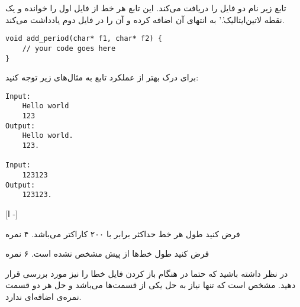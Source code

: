 \documentclass[../main.tex]{subfiles}
\begin{document}
تابع زیر نام دو فایل را دریافت می‌کند.
این تابع هر خط از فایل اول را خوانده و یک نقطه
‌لاتین{‌ایتالیک{'.'}}
به انتهای آن اضافه کرده و آن را در فایل دوم یادداشت می‌کند.

\begin{latin}
\begin{verbatim}
void add_period(char* f1, char* f2) {
    // your code goes here
}
\end{verbatim}
\end{latin}

برای درک بهتر از عملکرد تابع به مثال‌های زیر توجه کنید:

\begin{latin}
\begin{verbatim}
Input:
    Hello world
    123
Output:
    Hello world.
    123.

Input:
    123123
Output:
    123123.
\end{verbatim}
\end{latin}

[ا -]

 فرض کنید طول هر خط حداکثر برابر با ۲۰۰ کاراکتر می‌باشد. ۴ نمره

 فرض کنید طول خط‌ها از پیش مشخص نشده است. ۶ نمره


در نظر داشته باشید که حتما در هنگام باز کردن فایل خطا را نیز مورد بررسی قرار دهید.
مشخص است که تنها نیاز به حل یکی از قسمت‌ها می‌باشد و حل هر دو قسمت نمره‌ی اضافه‌ای ندارد.
\end{document}
